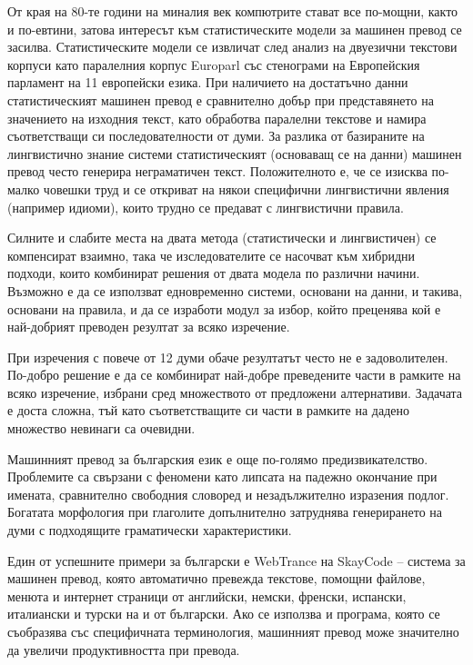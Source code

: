 \documentclass[]{../../metanetpaper}
\begin{document}
\begin{multicols}{2}
От края на 80-те години на миналия век компютрите стават все по-мощни, както и по-евтини, затова интересът към статистическите модели за машинен превод се засилва. Статистическите модели се извличат
 след анализ на двуезични текстови корпуси като
 паралелния корпус Europarl със стенограми на
 Европейския парламент на 11 европейски езика. При наличието на достатъчно данни статистическият машинен превод е сравнително добър при представянето на значението на изходния текст, като обработва паралелни текстове и намира съответстващи си последователности от думи. За разлика от базираните на лингвистично знание системи статистическият (основаващ се на данни) машинен превод често генерира неграматичен текст. Положителното е, че се изисква по-малко човешки труд и се откриват на някои специфични лингвистични явления (например идиоми), които трудно се предават с лингвистични правила. 


Силните и слабите места на двата метода (статистически и лингвистичен) се компенсират взаимно, така че изследователите се насочват към
 хибридни подходи, които комбинират решения от двата модела по различни начини. Възможно е да се използват едновременно системи, основани на данни, и
 такива, основани на правила, и да се изработи модул за избор, който преценява кой е най-добрият преводен резултат за всяко изречение. 

При изречения с повече от 12 думи обаче резултатът често не е задоволителен. По-добро решение е да се комбинират най-добре преведените части в рамките на всяко изречение, избрани сред множеството от предложени алтернативи. 
Задачата е доста сложна, тъй като съответстващите си части в рамките на дадено множество невинаги са очевидни.

Машинният превод за българския език е още по-голямо предизвикателство. Проблемите са свързани с феномени като липсата на падежно окончание при имената, сравнително свободния словоред и незадължително изразения подлог. Богатата морфология при глаголите допълнително затруднява генерирането на думи с подходящите граматически характеристики.

Един от успешните примери за български е WebTrance на SkayCode – система за машинен превод, която автоматично превежда текстове, помощни файлове, менюта и интернет страници от английски, немски, френски, испански, италиански и турски на и от български. Ако се използва и програма, която се съобразява със специфичната терминология, машинният превод може значително да увеличи продуктивността при превода.


\end{multicols}
\end{document}
